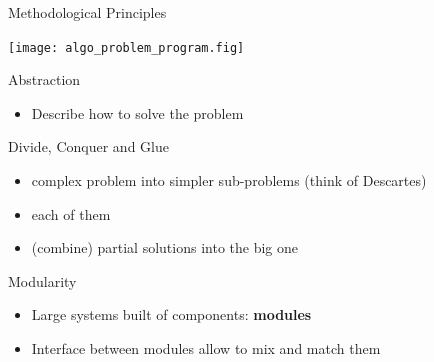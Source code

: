 \begin{frame}[t,squeeze]{Methodological Principles}
  \centerline{\texttt{[image: algo\_problem\_program.fig]}}

  \begin{block}{Abstraction
      \color{black}{\normalsize think before coding (!)}}
    \begin{itemize}
    \item Describe how to solve the problem
    \end{itemize}
  \end{block}\vspace{-.8\baselineskip}

  \begin{block}{Divide, Conquer and Glue 
      \color{black}{\normalsize(top-down approach)}}
    \begin{itemize}
    \item {} complex problem into simpler sub-problems
      (think of Descartes)
    \item {} each of them
    \item {} (combine) partial solutions into the big one
    \end{itemize}
  \end{block}\vspace{-.8\baselineskip}

  \begin{block}{Modularity}
    \begin{itemize}
    \item Large systems built of components: \textbf{modules}
    \item Interface between modules allow to mix and match them
    \end{itemize}
  \end{block}
\end{frame}
